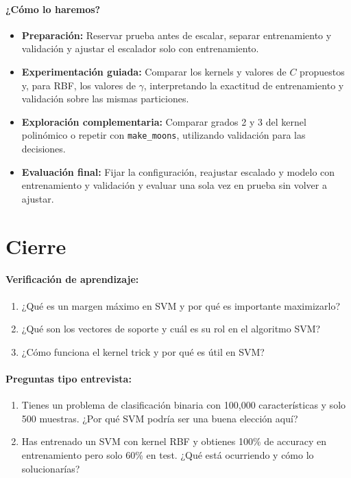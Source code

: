 \documentclass[a4,11pt]{aleph-notas}
\begin{document}
\paragraph{¿Cómo lo haremos?}
\begin{itemize}[leftmargin=*]
    \item \textbf{Preparación:} Reservar prueba antes de escalar, separar entrenamiento y validación y ajustar el escalador solo con entrenamiento.
    \item \textbf{Experimentación guiada:} Comparar los kernels y valores de $C$ propuestos y, para RBF, los valores de $\gamma$, interpretando la exactitud de entrenamiento y validación sobre las mismas particiones.
    \item \textbf{Exploración complementaria:} Comparar grados 2 y 3 del kernel polinómico o repetir con \texttt{make\_moons}, utilizando validación para las decisiones.
    \item \textbf{Evaluación final:} Fijar la configuración, reajustar escalado y modelo con entrenamiento y validación y evaluar una sola vez en prueba sin volver a ajustar.
\end{itemize}

\section*{Cierre}

\paragraph{Verificación de aprendizaje:}
\begin{enumerate}[leftmargin=*]
    \item ¿Qué es un margen máximo en SVM y por qué es importante maximizarlo?
    
    \item ¿Qué son los vectores de soporte y cuál es su rol en el algoritmo SVM?
    
    \item ¿Cómo funciona el kernel trick y por qué es útil en SVM?
\end{enumerate}

\paragraph{Preguntas tipo entrevista:}
\begin{enumerate}[leftmargin=*]
    \item Tienes un problema de clasificación binaria con 100,000 características y solo 500 muestras. ¿Por qué SVM podría ser una buena elección aquí?
    
    \item Has entrenado un SVM con kernel RBF y obtienes 100\% de accuracy en entrenamiento pero solo 60\% en test. ¿Qué está ocurriendo y cómo lo solucionarías?
\end{enumerate}
\end{document}
